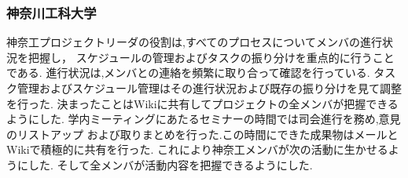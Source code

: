 \subsubsection{神奈川工科大学}
\par 神奈工プロジェクトリーダの役割は,すべてのプロセスについてメンバの進行状況を把握し，
スケジュールの管理およびタスクの振り分けを重点的に行うことである.
進行状況は,メンバとの連絡を頻繁に取り合って確認を行っている.
タスク管理およびスケジュール管理はその進行状況および既存の振り分けを見て調整を行った.
決まったことはWikiに共有してプロジェクトの全メンバが把握できるようにした.
学内ミーティングにあたるセミナーの時間では司会進行を務め,意見のリストアップ
および取りまとめを行った.この時間にできた成果物はメールとWikiで積極的に共有を行った.
これにより神奈工メンバが次の活動に生かせるようにした.
そして全メンバが活動内容を把握できるようにした.
